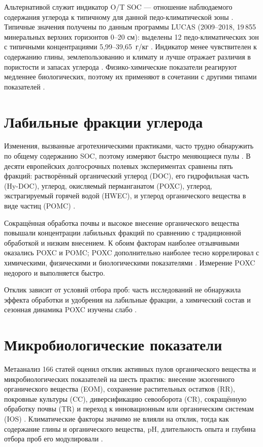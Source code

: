 \documentclass{ai4science_ysda}
\begin{document}
Альтернативой служит индикатор O/T SOC — отношение наблюдаемого содержания
углерода к типичному для данной педо-климатической зоны \cite{feeney2024}.
Типичные значения получены по данным программы LUCAS (2009--2018,
19\,855 минеральных верхних горизонтов 0--20 см): выделены 12
педо-климатических зон с типичными концентрациями 5,99--39,65~г/кг
\cite{feeney2024}. Индикатор менее чувствителен к содержанию глины,
землепользованию и климату и лучше отражает различия в пористости и
запасах углерода \cite{feeney2024}. Физико-химические показатели реагируют
медленнее биологических, поэтому их применяют в сочетании с другими типами
показателей \cite{cardoso2013}.

\section{Лабильные фракции углерода}

\porozhdeno{} Изменения, вызванные агротехническими практиками, часто
трудно обнаружить по общему содержанию SOC, поэтому измеряют быстро
меняющиеся пулы \cite{bongiorno2019}. В десяти европейских долгосрочных
полевых экспериментах сравнены пять фракций: растворённый органический
углерод (DOC), его гидрофильная часть (Hy-DOC), углерод, окисляемый
перманганатом (POXC), углерод, экстрагируемый горячей водой (HWEC), и
углерод органического вещества в виде частиц (POMC) \cite{bongiorno2019}.

Сокращённая обработка почвы и высокое внесение органического вещества
повышали концентрации лабильных фракций по сравнению с традиционной
обработкой и низким внесением. К обоим факторам наиболее отзывчивыми
оказались POXC и POMC; POXC дополнительно наиболее тесно коррелировал с
химическими, физическими и биологическими показателями
\cite{bongiorno2019}. Измерение POXC недорого и выполняется быстро.

Отклик зависит от условий отбора проб: часть исследований не обнаружила
эффекта обработки и удобрения на лабильные фракции, а химический состав и
сезонная динамика POXC изучены слабо \cite{bongiorno2019}.

\section{Микробиологические показатели}

\porozhdeno{} Метаанализ 166 статей оценил отклик активных пулов
органического вещества и микробиологических показателей на шесть практик:
внесение экзогенного органического вещества (EOM), сохранение растительных
остатков (RR), покровные культуры (CC), диверсификацию севооборота (CR),
сокращённую обработку почвы (TR) и переход к инновационным или органическим
системам (IOS) \cite{cusset2024}. Климатические факторы значимо не влияли
на отклик, тогда как содержание глины и органического вещества, pH,
длительность опыта и глубина отбора проб его модулировали
\cite{cusset2024}.
\end{document}
